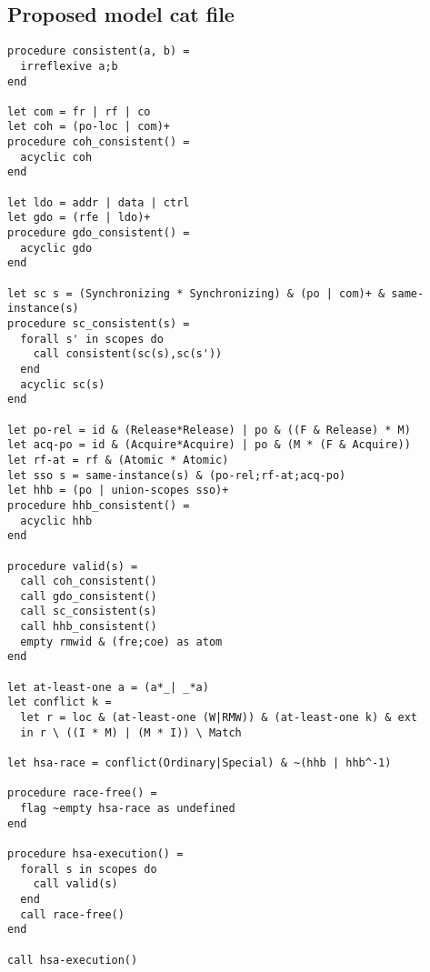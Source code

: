 \documentclass[a4paper]{article}
\begin{document}
\clearpage

\subsection{Proposed model cat file}
\begin{verbatim}
procedure consistent(a, b) =
  irreflexive a;b
end

let com = fr | rf | co
let coh = (po-loc | com)+
procedure coh_consistent() =
  acyclic coh
end

let ldo = addr | data | ctrl
let gdo = (rfe | ldo)+
procedure gdo_consistent() =
  acyclic gdo
end

let sc s = (Synchronizing * Synchronizing) & (po | com)+ & same-instance(s)
procedure sc_consistent(s) =
  forall s' in scopes do
    call consistent(sc(s),sc(s'))
  end
  acyclic sc(s)
end

let po-rel = id & (Release*Release) | po & ((F & Release) * M)
let acq-po = id & (Acquire*Acquire) | po & (M * (F & Acquire))
let rf-at = rf & (Atomic * Atomic)
let sso s = same-instance(s) & (po-rel;rf-at;acq-po)
let hhb = (po | union-scopes sso)+
procedure hhb_consistent() =
  acyclic hhb
end

procedure valid(s) =
  call coh_consistent()
  call gdo_consistent()
  call sc_consistent(s)
  call hhb_consistent()
  empty rmwid & (fre;coe) as atom
end

let at-least-one a = (a*_| _*a)
let conflict k =
  let r = loc & (at-least-one (W|RMW)) & (at-least-one k) & ext
  in r \ ((I * M) | (M * I)) \ Match

let hsa-race = conflict(Ordinary|Special) & ~(hhb | hhb^-1)

procedure race-free() =
  flag ~empty hsa-race as undefined
end

procedure hsa-execution() =
  forall s in scopes do
    call valid(s)
  end
  call race-free()
end

call hsa-execution()
\end{verbatim}

\clearpage

%
\end{document}
